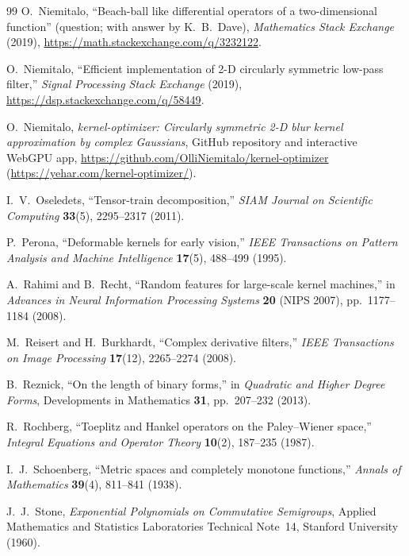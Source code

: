 \documentclass[11pt,a4paper]{article}
\theoremstyle{plain}
\theoremstyle{definition}
\begin{document}
\begin{thebibliography}{99}
O.~Niemitalo,
``Beach-ball like differential operators of a two-dimensional function'' (question; with answer by K.~B.~Dave),
\emph{Mathematics Stack Exchange} (2019),
\url{https://math.stackexchange.com/q/3232122}.

O.~Niemitalo,
``Efficient implementation of 2-D circularly symmetric low-pass filter,''
\emph{Signal Processing Stack Exchange} (2019),
\url{https://dsp.stackexchange.com/q/58449}.

O.~Niemitalo,
\emph{kernel-optimizer: Circularly symmetric 2-D blur kernel approximation by complex Gaussians},
GitHub repository and interactive WebGPU app, \url{https://github.com/OlliNiemitalo/kernel-optimizer} (\url{https://yehar.com/kernel-optimizer/}).

I.~V.~Oseledets,
``Tensor-train decomposition,''
\emph{SIAM Journal on Scientific Computing} \textbf{33}(5), 2295--2317 (2011).

P.~Perona,
``Deformable kernels for early vision,''
\emph{IEEE Transactions on Pattern Analysis and Machine Intelligence} \textbf{17}(5), 488--499 (1995).

A.~Rahimi and B.~Recht,
``Random features for large-scale kernel machines,''
in \emph{Advances in Neural Information Processing Systems} \textbf{20} (NIPS 2007), pp.~1177--1184 (2008).

M.~Reisert and H.~Burkhardt,
``Complex derivative filters,''
\emph{IEEE Transactions on Image Processing} \textbf{17}(12), 2265--2274 (2008).

B.~Reznick,
``On the length of binary forms,''
in \emph{Quadratic and Higher Degree Forms}, Developments in Mathematics \textbf{31}, pp.~207--232 (2013).

R.~Rochberg,
``Toeplitz and Hankel operators on the Paley--Wiener space,''
\emph{Integral Equations and Operator Theory} \textbf{10}(2), 187--235 (1987).

I.~J.~Schoenberg,
``Metric spaces and completely monotone functions,''
\emph{Annals of Mathematics} \textbf{39}(4), 811--841 (1938).

J.~J.~Stone,
\emph{Exponential Polynomials on Commutative Semigroups},
Applied Mathematics and Statistics Laboratories Technical Note~14, Stanford University (1960).


\end{thebibliography}
\end{document}
